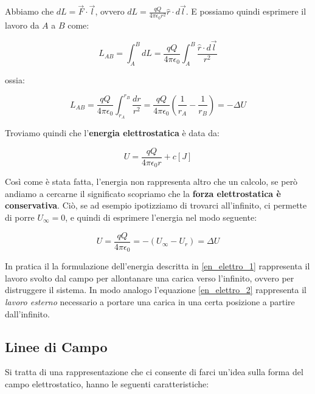 Abbiamo che $dL = \vec{F} \cdot \vec{l} $, ovvero $dL = \frac{qQ}{4\pi\epsilon_0 r^2} \hat{r} \cdot d\vec{l} $. E possiamo quindi esprimere il lavoro da $A$ a $B$ come: 

\begin{equation}
 L_{AB} = \int_{A}^{B} dL = \frac{qQ}{4\pi\epsilon_0} \int_{A}^{B} \frac{\hat{r} \cdot d\vec{l}}{r^2}
 \end{equation}
 
 ossia: 
 
\begin{equation}
 L_{AB} = \frac{qQ}{4\pi\epsilon_0}\int_{r_A}^{r_B} {\frac{dr}{r^2}} = \frac{qQ}{4\pi\epsilon_0} \left(\frac{1}{r_A}-\frac{1}{r_B}\right) = -\Delta U
 \end{equation}
 
 Troviamo quindi che l'\textbf{energia elettrostatica} è data da:
 
\begin{large}
 \begin{equation}
 	U = \frac{qQ}{4\pi\epsilon_0r}  + c[J]
 	\label{en_elettro_1}
 \end{equation}
\end{large}

Così come è stata fatta, l'energia non rappresenta altro che un calcolo, se però andiamo a cercarne il significato scopriamo che la \textbf{forza elettrostatica è conservativa}. Ciò, se ad esempio ipotizziamo di trovarci all'infinito, ci permette di porre $U_\infty = 0$, e quindi di esprimere l'energia nel modo seguente: 

\begin{large}
\begin{equation}
	U = \frac{qQ}{4\pi\epsilon_0} = - (U_\infty - U_r) = \Delta U
	\label{en_elettro_2}
\end{equation}
\end{large}

In pratica il la formulazione dell'energia descritta in \ref{en_elettro_1} rappresenta il lavoro svolto dal campo per allontanare una carica verso l'infinito, ovvero per distruggere il sistema. In modo analogo l'equazione \ref{en_elettro_2} rappresenta il \textit{lavoro esterno} necessario a portare una carica in una certa posizione a partire dall'infinito.

\subsection{Linee di Campo}
Si tratta di una rappresentazione che ci consente di farci un'idea sulla forma del campo elettrostatico, hanno le seguenti caratteristiche: 

